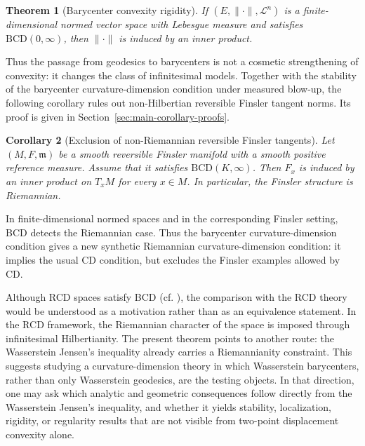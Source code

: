 \documentclass[a4paper,11pt]{article}
\numberwithin{equation}{section}
\newtheorem{theorem}{Theorem}[section]
\newtheorem{corollary}[theorem]{Corollary}
\begin{document}
	\begin{theorem}[Barycenter convexity rigidity]\label{thm:main-intro}
		If \((E,\|\cdot\|,\mathcal L^n)\) is a finite-dimensional normed vector space with Lebesgue measure and satisfies \(\mathrm{BCD}(0,\infty)\), then \(\|\cdot\|\) is induced by an inner product.
	\end{theorem}
	
	
	
	Thus the passage from geodesics to barycenters is not a cosmetic
strengthening of convexity: it changes the class of infinitesimal models. Together with the stability of the barycenter curvature-dimension condition under measured blow-up, the following corollary rules out non-Hilbertian reversible Finsler tangent norms. Its proof is given in Section~\ref{sec:main-corollary-proofs}.
	
	\begin{corollary}[Exclusion of non-Riemannian reversible Finsler tangents]
		\label{cor:finsler-exclusion}
		Let \((M,F,\mathfrak m)\) be a smooth reversible Finsler manifold with a smooth positive
		reference measure. Assume that it satisfies \(\mathrm{BCD}(K,\infty)\). Then \(F_x\) is induced by an inner product on \(T_xM\) for every \(x\in M\).
		In particular, the Finsler structure is Riemannian.
	\end{corollary}
	

	
	In finite-dimensional normed spaces and in the corresponding Finsler setting, BCD detects the Riemannian case.
	Thus the barycenter curvature-dimension condition gives  a new synthetic Riemannian curvature-dimension condition: it implies the usual CD condition, but excludes the Finsler examples allowed by CD.
	
	Although RCD spaces satisfy BCD (cf. \cite{HanLiuZhuBCD}), the comparison with the RCD theory would be understood as a motivation rather than as an equivalence statement. In the RCD framework, the Riemannian character of the space is imposed through infinitesimal Hilbertianity. The present theorem points to another route: the Wasserstein Jensen's inequality already carries a Riemannianity constraint. This suggests studying a curvature-dimension theory in which Wasserstein barycenters, rather than only Wasserstein geodesics, are the testing objects. In that direction, one may ask which analytic and geometric consequences follow directly from the Wasserstein Jensen's inequality, and whether it yields stability, localization, rigidity, or regularity results that are not visible from two-point displacement convexity alone.
	
\end{document}
